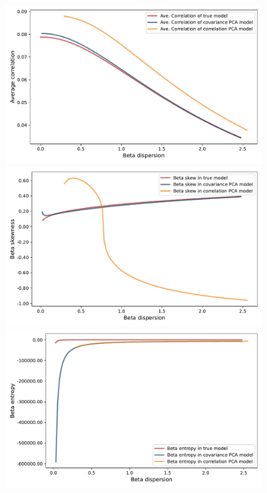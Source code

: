 \documentclass[leqno,12pt]{article}
\begin{document}
{\begin{figure}[htp]
\begin{center}
  \includegraphics[scale=0.33]{img/DispersionvsCorrelation1factorsN512T256fvol16minsvol30maxsvol90}
  \includegraphics[scale=0.33]{img/DispersionvsSkew1factorsN512T256fvol16minsvol30maxsvol90}
  \includegraphics[scale=0.33]{img/DispersionvsEntropy1factorsN512T256fvol16minsvol30maxsvol90}

\end{center}
\end{figure}}
\end{document}
